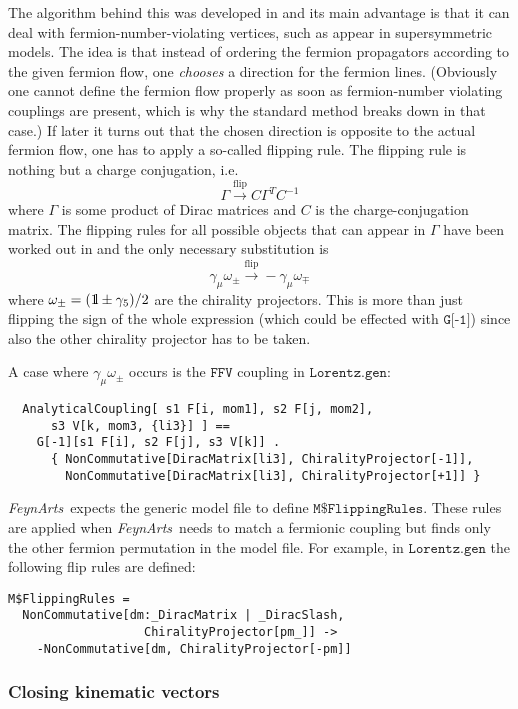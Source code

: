 \documentclass[twoside,12pt]{article}
\makeatletter
\def\indextt#1{\index{#1@\texttt{#1}}}
\def\FA{\textit{FeynArts}}
\def\ie{i.e.\ }
\def\unity{{\rm 1\mskip-4.25mu l}}
\def\Code#1{\ensuremath{\texttt{#1}}}
\makeatother
\begin{document}
The algorithm behind this was developed in \cite{DeEHK92} and its main
advantage is that it can deal with fermion-number-violating vertices,
such as appear in supersymmetric models.  The idea is that instead of
ordering the fermion propagators according to the given fermion flow,
one \emph{chooses} a direction for the fermion lines.  (Obviously one
cannot define the fermion flow properly as soon as fermion-number
violating couplings are present, which is why the standard method breaks
down in that case.)  If later it turns out that the chosen direction is
opposite to the actual fermion flow, one has to apply a so-called
flipping rule.  The flipping rule is nothing but a charge conjugation,
\ie
$$
\Gamma \overset{\text{flip}}{\longrightarrow} C \Gamma^T C^{-1}
$$
where $\Gamma$ is some product of Dirac matrices and $C$ is the
charge-conjugation matrix.  The flipping rules for all possible objects
that can appear in $\Gamma$ have been worked out in \cite{DeEHK92} and the
only necessary substitution is
$$
\gamma_\mu\omega_\pm \overset{\text{flip}}{\longrightarrow}
-\gamma_\mu\omega_\mp
$$
%
where $\omega_\pm = (\unity\pm\gamma_5)/2$ are the chirality projectors. 
This is more than just flipping the sign of the whole expression (which
could be effected with \Code{G[-1]}) since also the other chirality
projector has to be taken.

A case where $\gamma_\mu\omega_\pm$ occurs is the \Code{FFV} coupling
in \Code{Lorentz.gen}:
\begin{verbatim}
  AnalyticalCoupling[ s1 F[i, mom1], s2 F[j, mom2],
      s3 V[k, mom3, {li3}] ] ==
    G[-1][s1 F[i], s2 F[j], s3 V[k]] .
      { NonCommutative[DiracMatrix[li3], ChiralityProjector[-1]],
        NonCommutative[DiracMatrix[li3], ChiralityProjector[+1]] }
\end{verbatim}

\FA\ expects the generic model file to define \Code{M\$FlippingRules}.
These rules are applied when \FA\ needs to match a fermionic coupling 
but finds only the other fermion permutation in the model file.
For example, in \Code{Lorentz.gen} the following flip rules are 
defined:
\indextt{M\$FlippingRules}%
\begin{verbatim}
M$FlippingRules =
  NonCommutative[dm:_DiracMatrix | _DiracSlash,
                   ChiralityProjector[pm_]] ->
    -NonCommutative[dm, ChiralityProjector[-pm]]
\end{verbatim}


\subsubsection*{Closing kinematic vectors}
%
%
\end{document}

